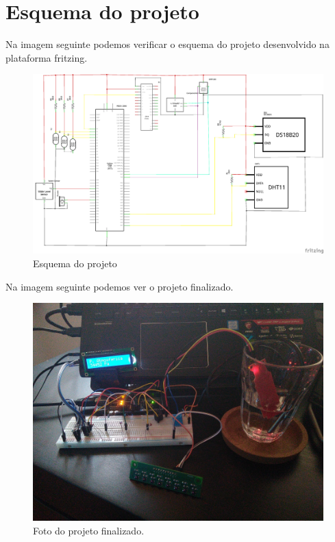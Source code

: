 \documentclass[11pt]{report}
\begin{document}
\clearpage


\section*{Esquema do projeto}

Na imagem seguinte podemos verificar o esquema do projeto desenvolvido na plataforma fritzing.

\medskip
\begin{figure} [!h]
\centering
\includegraphics[width=\textwidth]{Prints/esquema.png}
\caption{Esquema do projeto}
\end{figure}

\newpage
Na imagem seguinte podemos ver o projeto finalizado.

\begin{figure} [!h]
\centering
\includegraphics[width=\textwidth]{Prints/projecto.png}
\caption{Foto do projeto finalizado.}
\end{figure}
\end{document}

